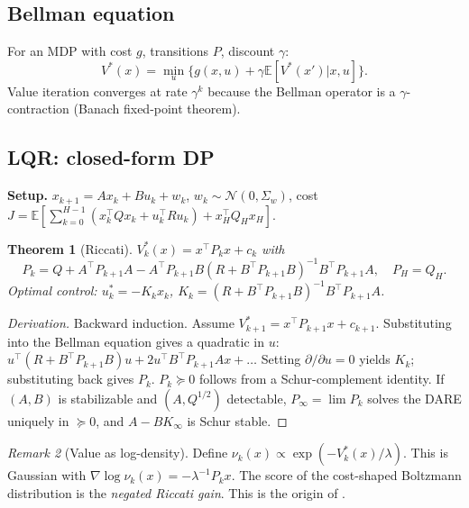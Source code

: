 \documentclass[11pt,letterpaper]{article}
\theoremstyle{plain}
\newtheorem{theorem}{Theorem}[section]
\theoremstyle{definition}
\theoremstyle{remark}
\newtheorem{remark}[theorem]{Remark}
\newcommand{\E}{\mathbb{E}}
\newcommand{\calN}{\mathcal{N}}
\newcommand{\grad}{\nabla}
\begin{document}
\subsection{Bellman equation}

For an MDP with cost $g$, transitions $P$, discount $\gamma$:
\begin{equation}
  V^*(x)=\min_u\{g(x,u)+\gamma\E[V^*(x')|x,u]\}.
  \label{eq:bellman}
\end{equation}
Value iteration converges at rate $\gamma^k$ because the Bellman operator
is a $\gamma$-contraction (Banach fixed-point theorem).

\subsection{LQR: closed-form DP}\label{sec:lqr}

\textbf{Setup.} $x_{k+1}=Ax_k+Bu_k+w_k$, $w_k\sim\calN(0,\Sigma_w)$,
cost $J=\E[\sum_{k=0}^{H-1}(x_k^\top Qx_k+u_k^\top Ru_k)+x_H^\top Q_Hx_H]$.

\begin{theorem}[Riccati]\label{thm:lqr}
$V_k^*(x)=x^\top P_kx+c_k$ with
\begin{equation}
  P_k=Q+A^\top P_{k+1}A-A^\top P_{k+1}B(R+B^\top P_{k+1}B)^{-1}B^\top P_{k+1}A,
  \quad P_H=Q_H.
  \label{eq:dare}
\end{equation}
Optimal control: $u_k^*=-K_kx_k$,
$K_k=(R+B^\top P_{k+1}B)^{-1}B^\top P_{k+1}A$.
\end{theorem}

\begin{advancedmath}
\begin{proof}[Derivation]
Backward induction. Assume $V_{k+1}^*=x^\top P_{k+1}x+c_{k+1}$.
Substituting into the Bellman equation gives a quadratic in $u$:
$u^\top(R+B^\top P_{k+1}B)u+2u^\top B^\top P_{k+1}Ax+\dots$ Setting
$\partial/\partial u=0$ yields $K_k$; substituting back gives $P_k$.
$P_k\succeq 0$ follows from a Schur-complement identity.
If $(A,B)$ is stabilizable and $(A,Q^{1/2})$ detectable,
$P_\infty=\lim P_k$ solves the DARE uniquely in $\succeq 0$, and
$A-BK_\infty$ is Schur stable.
\end{proof}

\begin{remark}[Value as log-density]\label{rem:logdensity}
Define $\nu_k(x)\propto\exp(-V_k^*(x)/\lambda)$. This is Gaussian with
$\grad\log\nu_k(x)=-\lambda^{-1}P_kx$. The score of the cost-shaped
Boltzmann distribution is the \emph{negated Riccati gain}. This is the
origin of .
\end{remark}
\end{advancedmath}
\end{document}
